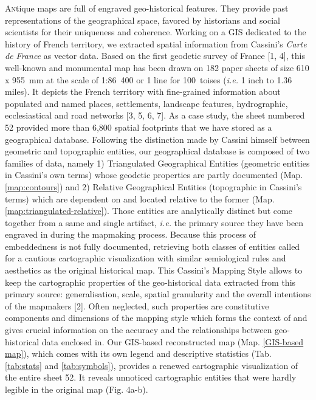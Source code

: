 \documentclass[portrait, A0]{sciposter}
\begin{document}
\begin{minipage}[b]{\textwidth}
\begin{multicols}{3}
\lettrine{A}ntique maps are full of engraved geo-historical features. They provide past representations of the geographical space, favored by historians and social scientists for their uniqueness and coherence. Working on a GIS dedicated to the history of French territory, we extracted spatial information from Cassini’s \textit{Carte de France} as vector data. Based on the first geodetic survey of France [1, 4], this well-known and monumental map has been drawn on 182 paper sheets of size 610 x 955~mm at the scale of 1:86~400 or 1 line for 100~toises (\textit{i.e.} 1 inch to 1.36 miles). It depicts the French territory with fine-grained information about populated and named places, settlements, landscape features, hydrographic, ecclesiastical and road networks [3, 5, 6, 7]. As a case study, the sheet numbered 52 provided more than 6,800 spatial footprints that we have stored as a geographical database. Following the distinction made by Cassini himself between \og geometric \fg and \og topographic \fg entities, our geographical database is composed of two families of data, namely 1) Triangulated Geographical Entities (\og geometric \fg entities in Cassini’s own terms) whose geodetic properties are partly documented (Map. \ref{map:contours}) and 2) Relative Geographical Entities (\og topographic \fg in Cassini’s terms) which are dependent on and located relative to the former (Map. \ref{map:triangulated-relative}). Those entities are analytically distinct but come together from a same and single artifact, \emph{i.e.} the primary source they have been engraved in during the mapmaking process. Because this process of embeddedness is not fully documented, retrieving both classes of entities called for a cautious cartographic visualization with similar semiological rules and aesthetics as the original historical map. This \og Cassini's Mapping Style \fg allows to keep the cartographic properties of the geo-historical data extracted from this primary source: generalisation, scale, spatial granularity and the overall intentions of the mapmakers [2]. Often neglected, such properties are constitutive components and dimensions of the mapping style which forms the context of and gives crucial information on the accuracy and the relationships between geo-historical data enclosed in. Our GIS-based reconstructed map (Map. \ref{GIS-based map}),  which comes with its own legend and descriptive statistics (Tab. \ref{tab:stats} and \ref{tab:symbols}), provides a renewed cartographic visualization of the entire sheet 52. It reveals unnoticed cartographic entities that were hardly legible in the original map (Fig. 4a-b).\\
\vfill



\end{multicols}
\end{minipage}
\end{document}
